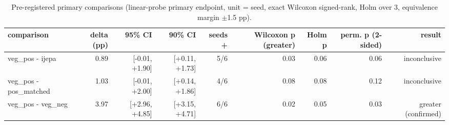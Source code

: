 \begin{table}[t]
\centering
\small
\caption{Pre-registered primary comparisons (linear-probe primary endpoint, unit = seed, exact Wilcoxon signed-rank, Holm over 3, equivalence margin $\pm$1.5 pp).}
\label{tab:primary_comparisons}
\begin{tabular}{lrrrrrrrr}
\toprule
comparison & delta (pp) & 95\% CI & 90\% CI & seeds + & Wilcoxon p (greater) & Holm p & perm. p (2-sided) & result \\
\midrule
veg\_pos - ijepa & 0.89 & [-0.01, +1.90] & [+0.11, +1.73] & 5/6 & 0.03 & 0.06 & 0.06 & inconclusive \\
veg\_pos - pos\_matched & 1.03 & [-0.01, +2.00] & [+0.14, +1.86] & 4/6 & 0.08 & 0.08 & 0.12 & inconclusive \\
veg\_pos - veg\_neg & 3.97 & [+2.96, +4.85] & [+3.15, +4.71] & 6/6 & 0.02 & 0.05 & 0.03 & greater (confirmed) \\
\bottomrule
\end{tabular}
\end{table}
